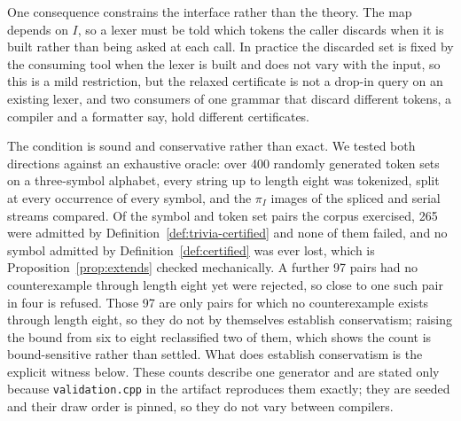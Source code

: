 \documentclass[11pt,a4paper]{article}
\theoremstyle{definition}
\theoremstyle{plain}
\newcommand{\code}[1]{\texttt{#1}}
\begin{document}
One consequence constrains the interface rather than the theory. The map depends on $I$, so a lexer must be told which
tokens the caller discards when it is built rather than being asked at each call. In practice the discarded set is
fixed by the consuming tool when the lexer is built and does not vary with the input, so this is a mild restriction,
but the relaxed certificate is not a drop-in query on an existing lexer, and two consumers of one grammar that
discard different tokens, a compiler and a formatter say, hold different certificates.

The condition is sound and conservative rather than exact. We tested both directions against an exhaustive oracle:
over 400 randomly generated token sets on a three-symbol alphabet, every string up to length eight was tokenized,
split at every occurrence of every symbol, and the $\pi_I$ images of the spliced and serial streams compared. Of the
symbol and token set pairs the corpus exercised, 265 were admitted by Definition~\ref{def:trivia-certified} and none
of them failed, and no symbol admitted by Definition~\ref{def:certified} was ever lost, which is
Proposition~\ref{prop:extends} checked mechanically. A further 97 pairs had no counterexample through length eight yet
were rejected, so close to one such pair in four is refused. Those 97 are only pairs for which no counterexample
exists through length eight, so they do not by themselves establish conservatism; raising the bound from six to eight
reclassified two of them, which shows the count is bound-sensitive rather than settled. What does establish
conservatism is the explicit witness below. These counts describe one generator and are stated only because
\code{validation.cpp} in the artifact reproduces them exactly; they are seeded and their draw order is pinned, so they
do not vary between compilers.
\end{document}
